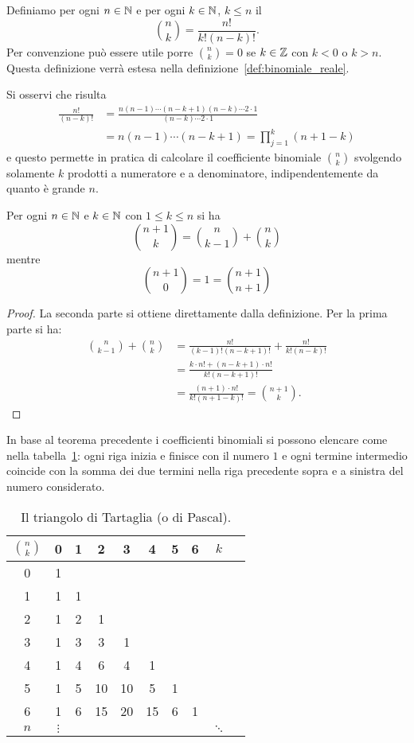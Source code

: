 \begin{definition}
\label{def:binomiale}
\mymark{***}
Definiamo per ogni $n\in \mathbb N$ e per ogni $k\in \mathbb N$, $k\le n$
il 
\[
{n \choose k}
=\frac{n!}{k!(n-k)!}.
\]
Per convenzione può essere utile porre
${n \choose k}=0$ se $k\in \mathbb Z$ con $k< 0$ o $k>n$.
Questa definizione verrà estesa nella definizione~\ref{def:binomiale_reale}.
\end{definition}
%
Si osservi che risulta
\begin{align*}
\frac{n!}{(n-k)!} &= \frac{n (n-1) \cdots (n-k+1)(n-k) \cdots 2\cdot 1}{(n-k) \cdots 2\cdot 1}\\
 &= n (n-1) \cdots (n-k+1) = \prod_{j=1}^k (n+1-k)
\end{align*}
e questo permette in pratica di calcolare il coefficiente binomiale ${n \choose k}$
svolgendo solamente $k$ prodotti a numeratore e a denominatore, indipendentemente
da quanto è grande $n$.

\begin{theorem}
\mymark{*}
Per ogni $n\in \mathbb N$ e $k \in \mathbb N$ con $1 \le k \le n$ si ha
\[
  {n+1 \choose k} =
      {n \choose k-1} + {n \choose k}
\]
mentre
\[
  {n+1 \choose 0} = 1 = {n+1 \choose n+1}
\]
\end{theorem}
%
\begin{proof}
La seconda parte si ottiene direttamente dalla definizione.
Per la prima parte si ha:
\begin{align*}
{n \choose k-1} + {n \choose k}
&= \frac{n!}{(k-1)!(n-k+1)!} + \frac{n!}{k!(n-k)!} \\
&= \frac{k\cdot n! + (n-k+1)\cdot n!}{k!(n-k+1)!} \\
&= \frac{(n+1)\cdot n!}{k!(n+1-k)!}
= {n+1 \choose k}.
\end{align*}
\end{proof}

In base al teorema precedente i coefficienti binomiali si possono
elencare come nella tabella~\ref{tab:binomiali}:
ogni riga inizia e finisce con il numero $1$
e ogni termine intermedio coincide con la somma dei
due termini nella riga precedente sopra e
a sinistra del numero considerato.

\begin{table}
\begin{tabular}{c|ccccccccc}
$\displaystyle{n \choose k}$& 0 & 1 & 2 & 3 & 4 & 5 & 6 & $k$ &\\ \hline
  0 & 1 &   &   &   &   &   &   & &\\
  1 & 1 & 1 &   &   &   &   &   & &\\
  2 & 1 & 2 & 1 &   &   &   &   & &\\
  3 & 1 & 3 & 3 & 1 &   &   &   & &\\
  4 & 1 & 4 & 6 & 4 & 1 &   &   & &\\
  5 & 1 & 5 & 10& 10& 5 & 1 &   & &\\
  6 & 1 & 6 & 15& 20& 15& 6 & 1 & &\\
$n$ &$\vdots$&&   &   &   &   &   & $\ddots$ &
\end{tabular}
\caption{Il triangolo di Tartaglia (o di Pascal).}
\label{tab:binomiali}
\end{table}

